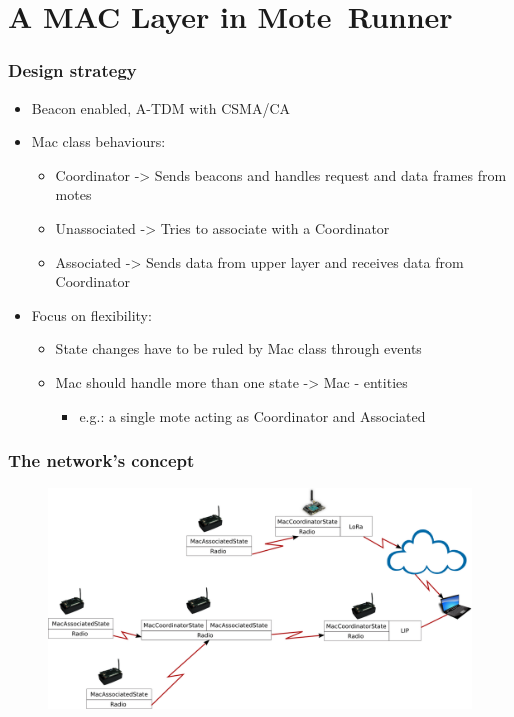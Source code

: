 \section{A MAC Layer in \mbox{Mote Runner}}
\begin{frame}[fragile]
  \frametitle{Design strategy}
  \begin{itemize}
  	\item Beacon enabled, A-TDM with CSMA/CA
    \item Mac class behaviours:
    \begin{itemize}
      \item Coordinator -> Sends beacons and handles request and data frames from motes
      \item Unassociated -> Tries to associate with a Coordinator
      \item Associated -> Sends data from upper layer and receives data from Coordinator
    \end{itemize}
    \item Focus on flexibility:
    \begin{itemize}
    	\item State changes have to be ruled by Mac class through events
    	\item Mac should handle more than one state -> Mac - entities
    	\begin{itemize}
	  \item e.g.: a single mote acting as Coordinator and Associated
    	\end{itemize}
    \end{itemize}
  \end{itemize}
\end{frame}

\begin{frame}[fragile]
  \frametitle{The network's concept}
  \begin{figure}
    \centering
    \includegraphics[width=\textwidth]{img/MAClan.png}
  \end{figure}
\end{frame}


